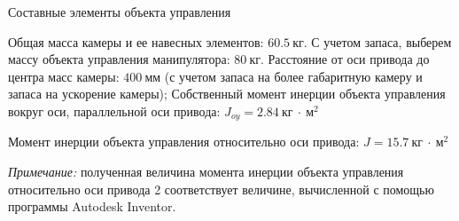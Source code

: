 \begin{table}[ht!]
    \caption{Составные элементы объекта управления}
\end{table}

Общая масса камеры и ее навесных элементов: $60.5 ~\textit{кг}$. С учетом запаса, выберем
массу объекта управления манипулятора: $80 ~\textit{кг}$.
Расстояние от оси привода до центра масс камеры: $400 ~\textit{мм}$ (с учетом запаса
на более габаритную камеру и запаса на ускорение камеры);
Собственный момент инерции объекта управления вокруг оси, параллельной оси привода:
$ J_{oy} = 2.84 ~\textit{кг}~\cdot~\textit{м}^2 $

Момент инерции объекта управления относительно оси привода:
$ J = 15.7 ~\textit{кг}~\cdot~\textit{м}^2 $

\textit{Примечание:} полученная величина момента инерции объекта управления относительно
оси привода 2 соответствует величине, вычисленной с помощью программы Autodesk Inventor.
